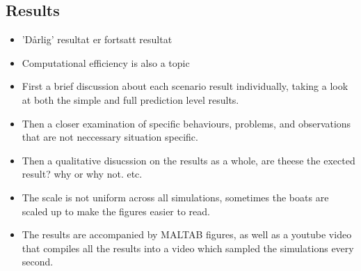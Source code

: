 \subsection{Results}
\begin{itemize}
    \item 'Dårlig' resultat er fortsatt resultat
    \item Computational efficiency is also a topic
    \item First a brief discussion about each scenario result individually, taking a look at both the simple and full prediction level results.
    \item Then a closer examination of specific behaviours, problems, and observations that are not neccessary situation specific.
    \item Then a qualitative disucssion on the results as a whole, are theese the exected result? why or why not. etc.
    \item The scale is not uniform across all simulations, sometimes the boats are scaled up to make the figures easier to read.
    \item The results are accompanied by MALTAB figures, as well as a youtube video that compiles all the results into a video which sampled the simulations every second.
\end{itemize}


